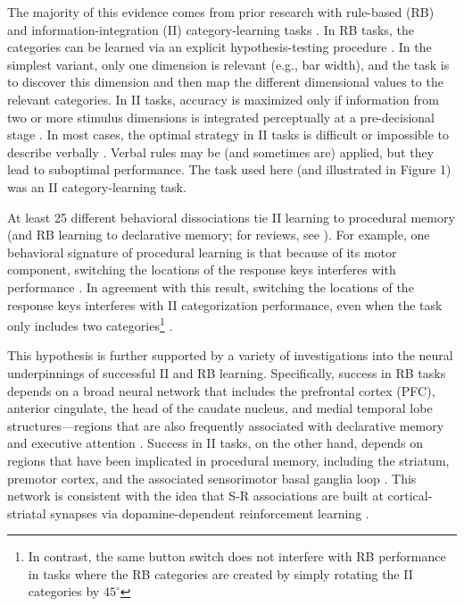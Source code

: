 \documentclass[man,apacite,draftfirst]{apa6}
\begin{document}
The majority of this evidence comes from prior research with rule-based (RB) and
information-integration (II) category-learning tasks \cite{HelieRoederAshby2010,
NomuraEtAl2007, SotoEtAl2013, WaldschmidtAshby2011}. In RB tasks, the categories
can be learned via an explicit hypothesis-testing procedure
\cite{AshbyCOVIS1998}. In the simplest variant, only one dimension is relevant
(e.g., bar width), and the task is to discover this dimension and then map the
different dimensional values to the relevant categories. In II tasks, accuracy
is maximized only if information from two or more stimulus dimensions is
integrated perceptually at a pre-decisional stage \cite{AshbyGott1988}. In most
cases, the optimal strategy in II tasks is difficult or impossible to describe
verbally \cite{AshbyCOVIS1998}. Verbal rules may be (and sometimes are) applied,
but they lead to suboptimal performance. The task used here (and illustrated in
Figure 1) was an II category-learning task.

At least 25 different behavioral dissociations tie II learning to procedural
memory (and RB learning to declarative memory; for reviews, see
). For example, one
behavioral signature of procedural learning is that because of its motor
component, switching the locations of the response keys interferes with
performance \cite{WillinghamButtonSwitch2000}. In agreement with this result, switching
the locations of the response keys interferes with II categorization
performance, even when the task only includes two categories\footnote{In
contrast, the same button switch does not interfere with RB performance in tasks
where the RB categories are created by simply rotating the II categories by
$45^\circ$} \cite{AshbyEllWaldron2003, MaddoxBohilIng2004, SpieringAshby2008}.

This hypothesis is further supported by a variety of investigations into the
neural underpinnings of successful II and RB learning. Specifically, success in
RB tasks depends on a broad neural network that includes the prefrontal cortex
(PFC), anterior cingulate, the head of the caudate nucleus, and medial temporal
lobe structures---regions that are also frequently associated with declarative
memory and executive attention \cite{BrownMarsden1988, FiloteoEtAl2007,
MuhammadWallisMiller2006, SegerCincotta2006}. Success in II tasks, on the other
hand, depends on regions that have been implicated in procedural memory,
including the striatum, premotor cortex, and the associated sensorimotor basal
ganglia loop \cite{AshbyEnnis2006, FiloteoMaddoxSalmonSong2005,
KnowltonMangelsSquire1996, NomuraEtAl2007}. This network is consistent with the
idea that S-R associations are built at cortical-striatal synapses via
dopamine-dependent reinforcement learning \cite{AshbyCrossley2011,
HoukAdamsBarto1995, joel_actorcritic_2002}.
\end{document}
